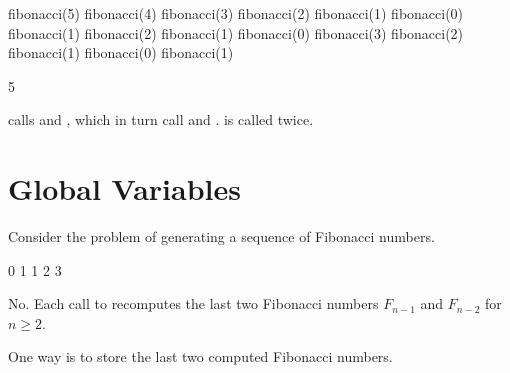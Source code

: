 \documentclass[letterpaper,10pt,english]{sphinxmanual}
\begin{document}
\begin{sphinxVerbatim}[commandchars=\\\{\}]
fibonacci(5)
fibonacci(4)
fibonacci(3)
fibonacci(2)
fibonacci(1)
fibonacci(0)
fibonacci(1)
fibonacci(2)
fibonacci(1)
fibonacci(0)
fibonacci(3)
fibonacci(2)
fibonacci(1)
fibonacci(0)
fibonacci(1)
\end{sphinxVerbatim}

\begin{sphinxVerbatim}[commandchars=\\\{\}]
5
\end{sphinxVerbatim}

 calls  and , which in turn call  and .  is called twice.


\section{Global Variables}
\label{\detokenize{Lecture6/More on Functions:global-variables}}
Consider the problem of generating a sequence of Fibonacci numbers.

\begin{sphinxVerbatim}[commandchars=\\\{\}]
   
\end{sphinxVerbatim}

\begin{sphinxVerbatim}[commandchars=\\\{\}]
0
1
1
2
3
\end{sphinxVerbatim}


No. Each call to  recomputes the last two Fibonacci numbers \(F_{n-1}\) and \(F_{n-2}\) for \(n\geq 2\).


One way is to store the last two computed Fibonacci numbers.
\end{document}

